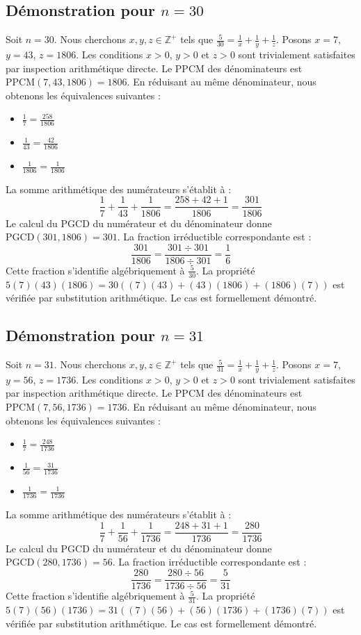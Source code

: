 \documentclass[12pt,a4paper]{article}
\begin{document}
\subsection{Démonstration pour $n = 30$}
Soit $n = 30$. Nous cherchons $x, y, z \in \mathbb{Z}^{+}$ tels que $\frac{5}{30} = \frac{1}{x} + \frac{1}{y} + \frac{1}{z}$.
Posons $x = 7$, $y = 43$, $z = 1806$.
Les conditions $x > 0$, $y > 0$ et $z > 0$ sont trivialement satisfaites par inspection arithmétique directe.
Le PPCM des dénominateurs est $\text{PPCM}(7, 43, 1806) = 1806$.
En réduisant au même dénominateur, nous obtenons les équivalences suivantes :
\begin{itemize}
    \item $\frac{1}{7} = \frac{258}{1806}$
    \item $\frac{1}{43} = \frac{42}{1806}$
    \item $\frac{1}{1806} = \frac{1}{1806}$
\end{itemize}
La somme arithmétique des numérateurs s'établit à :
$$ \frac{1}{7} + \frac{1}{43} + \frac{1}{1806} = \frac{258 + 42 + 1}{1806} = \frac{301}{1806} $$
Le calcul du PGCD du numérateur et du dénominateur donne $\text{PGCD}(301, 1806) = 301$.
La fraction irréductible correspondante est :
$$ \frac{301}{1806} = \frac{301 \div 301}{1806 \div 301} = \frac{1}{6} $$
Cette fraction s'identifie algébriquement à $\frac{5}{30}$.
La propriété $5(7)(43)(1806) = 30((7)(43) + (43)(1806) + (1806)(7))$ est vérifiée par substitution arithmétique.
Le cas est formellement démontré.

\subsection{Démonstration pour $n = 31$}
Soit $n = 31$. Nous cherchons $x, y, z \in \mathbb{Z}^{+}$ tels que $\frac{5}{31} = \frac{1}{x} + \frac{1}{y} + \frac{1}{z}$.
Posons $x = 7$, $y = 56$, $z = 1736$.
Les conditions $x > 0$, $y > 0$ et $z > 0$ sont trivialement satisfaites par inspection arithmétique directe.
Le PPCM des dénominateurs est $\text{PPCM}(7, 56, 1736) = 1736$.
En réduisant au même dénominateur, nous obtenons les équivalences suivantes :
\begin{itemize}
    \item $\frac{1}{7} = \frac{248}{1736}$
    \item $\frac{1}{56} = \frac{31}{1736}$
    \item $\frac{1}{1736} = \frac{1}{1736}$
\end{itemize}
La somme arithmétique des numérateurs s'établit à :
$$ \frac{1}{7} + \frac{1}{56} + \frac{1}{1736} = \frac{248 + 31 + 1}{1736} = \frac{280}{1736} $$
Le calcul du PGCD du numérateur et du dénominateur donne $\text{PGCD}(280, 1736) = 56$.
La fraction irréductible correspondante est :
$$ \frac{280}{1736} = \frac{280 \div 56}{1736 \div 56} = \frac{5}{31} $$
Cette fraction s'identifie algébriquement à $\frac{5}{31}$.
La propriété $5(7)(56)(1736) = 31((7)(56) + (56)(1736) + (1736)(7))$ est vérifiée par substitution arithmétique.
Le cas est formellement démontré.
\end{document}
